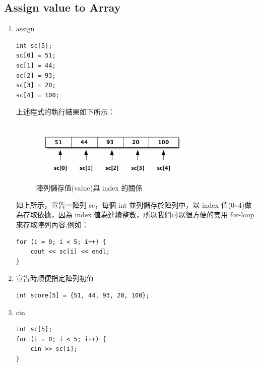 \documentclass[a4paper,12pt]{article}
\begin{document}
\subsection{Assign value to Array}
\label{sec:orgfa78a43}
\begin{enumerate}
\item assign
\label{sec:orgb8083f3}
\lstset{breaklines=true,language=cpp,label= ,caption= ,captionpos=b,firstnumber=1,numbers=left}
\begin{lstlisting}
int sc[5];
sc[0] = 51;
sc[1] = 44;
sc[2] = 93;
sc[3] = 20;
sc[4] = 100;
\end{lstlisting}

上述程式的執行結果如下所示：\\
\begin{figure}[htbp]
\centering
\includegraphics[width=300]{images/array.png}
\caption{\label{fig:Array}陣列儲存值(value)與 index 的關係}
\end{figure}

如上所示，宣告一陣列 sc，每個 int 並列儲存於陣列中，以 index 值(0\textasciitilde{}4)做為存取依據，因為 index 值為連續整數，所以我們可以很方便的套用 for-loop 來存取陣列內容,例如：\\
\lstset{breaklines=true,language=cpp,label= ,caption= ,captionpos=b,firstnumber=1,numbers=left}
\begin{lstlisting}
for (i = 0; i < 5; i++) {
    cout << sc[i] << endl;
}
\end{lstlisting}

\item 宣告時順便指定陣列初值
\label{sec:org20ab84b}
\lstset{breaklines=true,language=cpp,label= ,caption= ,captionpos=b,firstnumber=1,numbers=left}
\begin{lstlisting}
int score[5] = {51, 44, 93, 20, 100};
\end{lstlisting}

\item cin
\label{sec:org40a82e9}
\lstset{breaklines=true,language=cpp,label= ,caption= ,captionpos=b,firstnumber=1,numbers=left}
\begin{lstlisting}
int sc[5];
for (i = 0; i < 5; i++) {
    cin >> sc[i];
}
\end{lstlisting}
\end{enumerate}
\end{document}

